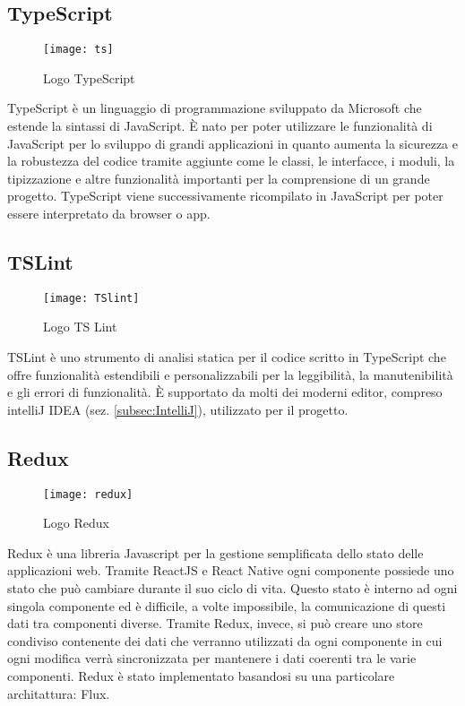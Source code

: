 \subsection{TypeScript}
\begin{figure}[H] 
	\centering
	\texttt{[image: ts]}
	\caption{Logo TypeScript}
\end{figure}
TypeScript è un linguaggio di programmazione sviluppato da Microsoft che 
estende la sintassi di JavaScript.  È nato per poter utilizzare le funzionalità di 
JavaScript per lo sviluppo di grandi applicazioni in quanto aumenta la 
sicurezza e la robustezza del codice tramite aggiunte come le classi, le 
interfacce, i moduli, la tipizzazione e altre funzionalità importanti per la 
comprensione di un grande progetto. 
TypeScript viene successivamente ricompilato in JavaScript per poter essere 
 interpretato da browser o app.

\subsection{TSLint}
\begin{figure}[H] 
	\centering
	\texttt{[image: TSlint]}
	\caption{Logo TS Lint}
\end{figure}
TSLint è uno strumento di analisi statica per il codice scritto in TypeScript che offre funzionalità estendibili e personalizzabili per la leggibilità, la manutenibilità e gli errori di funzionalità. È supportato da molti dei moderni editor, compreso intelliJ IDEA (sez. \ref{subsec:IntelliJ}), utilizzato per il progetto.

\subsection{Redux}
\begin{figure}[H] 
	\centering
	\texttt{[image: redux]}
	\caption{Logo Redux}
\end{figure}
Redux è una libreria Javascript per la gestione semplificata dello stato delle applicazioni web. Tramite ReactJS e React Native ogni componente possiede uno stato che può cambiare durante il suo ciclo di vita. Questo stato è interno ad ogni singola componente ed è difficile, a volte impossibile, la comunicazione di questi dati tra componenti diverse. 
Tramite Redux, invece, si può creare uno store condiviso contenente dei dati che verranno utilizzati da ogni componente in cui ogni modifica verrà sincronizzata per mantenere i dati coerenti tra le varie componenti.
Redux è stato implementato basandosi su una particolare architattura: Flux.

